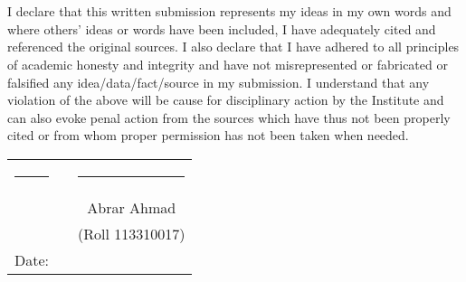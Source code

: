 \chapter*{}
\thispagestyle{empty}

I declare that this written submission represents my ideas in my own words
and where others' ideas or words have been included, I have adequately cited
and referenced the original sources. I also declare that I have adhered to all
principles of academic honesty and integrity and have not misrepresented or
fabricated or falsified any idea/data/fact/source in my submission. I
understand that any violation of the above will be cause for disciplinary
action by the Institute and can also evoke penal action from the sources which
have thus not been properly cited or from whom proper permission has not been
taken when needed.

\vspace{1.5cm}

\begin{tabular}{llc}
\rule{40mm}{0pt}        & \rule{50mm}{0pt}       & \rule{55mm}{0pt} \\
                        &                        & Abrar Ahmad \\
                        &                        & (Roll 113310017)\\
Date:\dotfill           &                        & \\
\end{tabular}